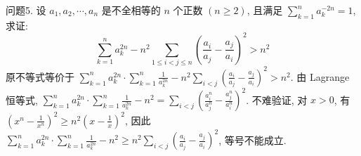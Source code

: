 问题5. 设 $a_1, a_2, \cdots, a_n$ 是不全相等的 $n$ 个正数 $(n \geqslant 2)$, 且满足 $\sum_{k=1}^n a_k^{-2 n}=1$, 求证:
$$
\sum_{k=1}^n a_k^{2 n}-n^2 \sum_{1 \leqslant i<j \leqslant n}\left(\frac{a_i}{a_j}-\frac{a_j}{a_i}\right)^2>n^2
$$
原不等式等价于 $\sum_{k=1}^n a_k^{2 n} \cdot \sum_{k=1}^n \frac{1}{a_k^{2 n}}-n^2 \sum_{i<j}\left(\frac{a_i}{a_j}-\frac{a_j}{a_i}\right)^2>n^2$.
由 Lagrange 恒等式, $\sum_{k=1}^n a_k^{2 n} \cdot \sum_{k=1}^n \frac{1}{a_k^{2 n}}-n^2=\sum_{i<j}\left(\frac{a_i^n}{a_j^n}-\frac{a_j^n}{a_i^n}\right)^2$.
不难验证, 对 $x>0$, 有 $\left(x^n-\frac{1}{x^n}\right)^2 \geqslant n^2\left(x-\frac{1}{x}\right)^2$, 因此 $\sum_{k=1}^n a_k^{2 n} \cdot \sum_{k=1}^n \frac{1}{a_k^{2 n}}- n^2 \geqslant n^2 \sum_{i<j}\left(\frac{a_i}{a_j}-\frac{a_j}{a_i}\right)^2$, 等号不能成立.



